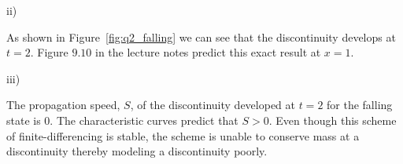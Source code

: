 \documentclass{article}
\begin{document}
\begin{homeworkProblem}
    \begin{homeworkSection}{ii)}
  
        As shown in Figure~\ref{fig:q2_falling} we can see that the
        discontinuity develops at $t = 2$. Figure $9.10$ in the lecture notes
        predict this exact result at $x = 1$.

    \end{homeworkSection}

    \begin{homeworkSection}{iii)}
   
        The propagation speed, $S$, of the discontinuity developed at $t = 2$
        for the falling state is 0. The characteristic curves predict that $S >
        0$. Even though this scheme of finite-differencing is stable, the
        scheme is unable to conserve mass at a discontinuity thereby modeling a
        discontinuity poorly.

    \end{homeworkSection}


\end{homeworkProblem} \clearpage
\end{document}
